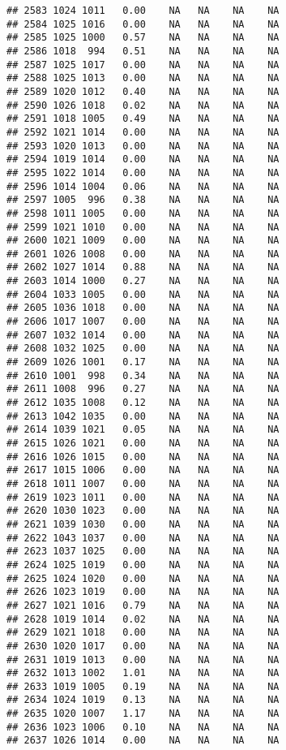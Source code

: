 \documentclass{article}\usepackage{graphicx, color}
\makeatletter
\newenvironment{kframe}{%
 \def\at@end@of@kframe{}%
 \ifinner\ifhmode%
  \def\at@end@of@kframe{\end{minipage}}%
  \begin{minipage}{\columnwidth}%
 \fi\fi%
 \def\FrameCommand##1{\hskip\@totalleftmargin \hskip-\fboxsep
 \colorbox{shadecolor}{##1}\hskip-\fboxsep
     \hskip-\linewidth \hskip-\@totalleftmargin \hskip\columnwidth}%
 \MakeFramed {\advance\hsize-\width
   \@totalleftmargin\z@ \linewidth\hsize
   \@setminipage}}%
 {\par\unskip\endMakeFramed%
 \at@end@of@kframe}
\newenvironment{knitrout}{}{} %
\makeatother
\begin{document}
\begin{knitrout}
\begin{kframe}
\begin{verbatim}
## 2583 1024 1011   0.00    NA   NA    NA    NA
## 2584 1025 1016   0.00    NA   NA    NA    NA
## 2585 1025 1000   0.57    NA   NA    NA    NA
## 2586 1018  994   0.51    NA   NA    NA    NA
## 2587 1025 1017   0.00    NA   NA    NA    NA
## 2588 1025 1013   0.00    NA   NA    NA    NA
## 2589 1020 1012   0.40    NA   NA    NA    NA
## 2590 1026 1018   0.02    NA   NA    NA    NA
## 2591 1018 1005   0.49    NA   NA    NA    NA
## 2592 1021 1014   0.00    NA   NA    NA    NA
## 2593 1020 1013   0.00    NA   NA    NA    NA
## 2594 1019 1014   0.00    NA   NA    NA    NA
## 2595 1022 1014   0.00    NA   NA    NA    NA
## 2596 1014 1004   0.06    NA   NA    NA    NA
## 2597 1005  996   0.38    NA   NA    NA    NA
## 2598 1011 1005   0.00    NA   NA    NA    NA
## 2599 1021 1010   0.00    NA   NA    NA    NA
## 2600 1021 1009   0.00    NA   NA    NA    NA
## 2601 1026 1008   0.00    NA   NA    NA    NA
## 2602 1027 1014   0.88    NA   NA    NA    NA
## 2603 1014 1000   0.27    NA   NA    NA    NA
## 2604 1033 1005   0.00    NA   NA    NA    NA
## 2605 1036 1018   0.00    NA   NA    NA    NA
## 2606 1017 1007   0.00    NA   NA    NA    NA
## 2607 1032 1014   0.00    NA   NA    NA    NA
## 2608 1032 1025   0.00    NA   NA    NA    NA
## 2609 1026 1001   0.17    NA   NA    NA    NA
## 2610 1001  998   0.34    NA   NA    NA    NA
## 2611 1008  996   0.27    NA   NA    NA    NA
## 2612 1035 1008   0.12    NA   NA    NA    NA
## 2613 1042 1035   0.00    NA   NA    NA    NA
## 2614 1039 1021   0.05    NA   NA    NA    NA
## 2615 1026 1021   0.00    NA   NA    NA    NA
## 2616 1026 1015   0.00    NA   NA    NA    NA
## 2617 1015 1006   0.00    NA   NA    NA    NA
## 2618 1011 1007   0.00    NA   NA    NA    NA
## 2619 1023 1011   0.00    NA   NA    NA    NA
## 2620 1030 1023   0.00    NA   NA    NA    NA
## 2621 1039 1030   0.00    NA   NA    NA    NA
## 2622 1043 1037   0.00    NA   NA    NA    NA
## 2623 1037 1025   0.00    NA   NA    NA    NA
## 2624 1025 1019   0.00    NA   NA    NA    NA
## 2625 1024 1020   0.00    NA   NA    NA    NA
## 2626 1023 1019   0.00    NA   NA    NA    NA
## 2627 1021 1016   0.79    NA   NA    NA    NA
## 2628 1019 1014   0.02    NA   NA    NA    NA
## 2629 1021 1018   0.00    NA   NA    NA    NA
## 2630 1020 1017   0.00    NA   NA    NA    NA
## 2631 1019 1013   0.00    NA   NA    NA    NA
## 2632 1013 1002   1.01    NA   NA    NA    NA
## 2633 1019 1005   0.19    NA   NA    NA    NA
## 2634 1024 1019   0.13    NA   NA    NA    NA
## 2635 1020 1007   1.17    NA   NA    NA    NA
## 2636 1023 1006   0.10    NA   NA    NA    NA
## 2637 1026 1014   0.00    NA   NA    NA    NA

\end{verbatim}
\end{kframe}
\end{knitrout}
\end{document}
